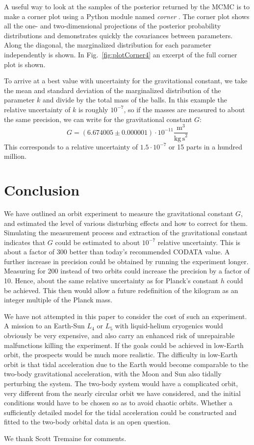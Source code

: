 \documentclass[onecolumn]{aa} %
\begin{document}
A useful way to look at the samples of the posterior returned by the MCMC is to make a corner plot using a Python module named \textit{corner} \citep{corner}. The corner plot shows all the one- and two-dimensional projections of the posterior probability distributions and demonstrates quickly the covariances between parameters. Along the diagonal, the marginalized distribution for each parameter independently is shown.
In Fig.~\ref{fig:plotCorner4} an excerpt of the full corner plot is shown. 

To arrive at a best value with uncertainty for the gravitational constant, we take the mean and standard deviation of the marginalized distribution of the parameter $k$ and divide by the total mass of the balls. In this example the relative uncertainty of $k$ is roughly $10^{-7}$, so if the masses are measured to about the same precision, we can write for the gravitational constant $G$:
\begin{equation}\label{Gfit}
G = \left(6.674005 \pm 0.000001 \right) \cdot 10^{-11}  \frac{\mathrm{m}^3}{\mathrm{kg \, s}^2}
\end{equation}
This corresponds to a relative uncertainty of $1.5 \cdot 10^{-7}$ or 15 parts in a hundred million.

\section{Conclusion}
We have outlined an orbit experiment to measure the gravitational
constant $G$, and estimated the level of various disturbing effects
and how to correct for them.  Simulating the measurement process and
extraction of the gravitational constant indicates that $G$ could be
estimated to about $10^{-7}$ relative uncertainty.  This is about a
factor of 300 better than today's recommended CODATA value. A further
increase in precision could be obtained by running the experiment
longer. Measuring for 200 instead of two orbits could increase the
precision by a factor of 10.  Hence, about the same relative
uncertainty as for Planck's constant $h$ \citep[$1.2 \cdot 10^{-8}$,
  see][]{CODATA17} could be achieved. This then would allow a future
redefinition of the kilogram as an integer multiple of the Planck
mass.

We have not attempted in this paper to consider the cost of such an
experiment.  A mission to an Earth-Sun $L_4$ or $L_5$ with
liquid-helium cryogenics would obviously be very expensive, and also
carry an enhanced risk of unrepairable malfunctions killing the
experiment.  If the goals could be achieved in low-Earth orbit, the
prospects would be much more realistic.  The difficulty in low-Earth
orbit is that tidal acceleration due to the Earth would become
comparable to the two-body gravitational acceleration, with the Moon
and Sun also tidally perturbing the system.  The two-body system would
have a complicated orbit, very different from the nearly circular
orbit we have considered, and the initial conditions would have to be
chosen so as to avoid chaotic orbits.  Whether a sufficiently detailed
model for the tidal acceleration could be constructed and fitted to
the two-body orbital data is an open question.

\bigskip

We thank Scott Tremaine for comments.



\end{document}
